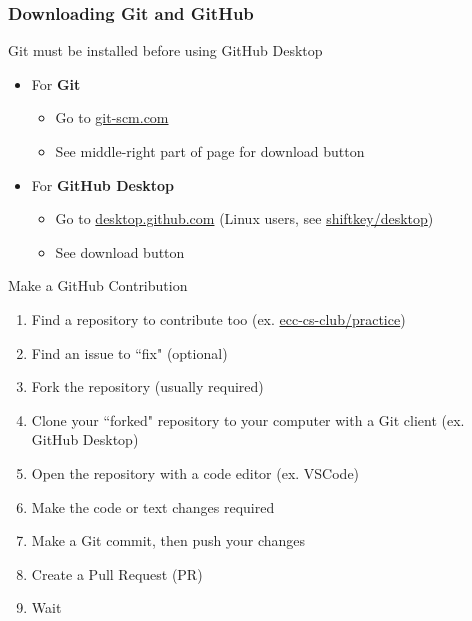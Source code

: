 \documentclass{beamer}
\begin{document}
\begin{frame}
	\frametitle{Downloading Git and GitHub}

	Git must be installed before using GitHub Desktop
	\newline

	\begin{itemize}
		\item For \textbf{Git}
			\begin{itemize}
				\item Go to \href{https://git-scm.com/}{git-scm.com}
				\item See middle-right part of page for download button
			\end{itemize}
		\item For \textbf{GitHub Desktop}
			\begin{itemize}
				\item Go to \href{https://desktop.github.com}{desktop.github.com} (Linux users, see \href{https://github.com/shiftkey/desktop/releases}{shiftkey/desktop})
				\item See download button
			\end{itemize}
	\end{itemize}
\end{frame}

\begin{frame}{Make a GitHub Contribution}
	\begin{enumerate}
		\item Find a repository to contribute too (ex. \href{https://github.com/ecc-cs-club/practice}{ecc-cs-club/practice})
		\item Find an issue to ``fix" (optional)
		\item Fork the repository (usually required)
		\item Clone your ``forked" repository to your computer with a Git client (ex. GitHub Desktop)
		\item Open the repository with a code editor (ex. VSCode)
		\item Make the code or text changes required
		\item Make a Git commit, then push your changes
		\item Create a Pull Request (PR)
		\item Wait
	\end{enumerate}
\end{frame}
\end{document}
